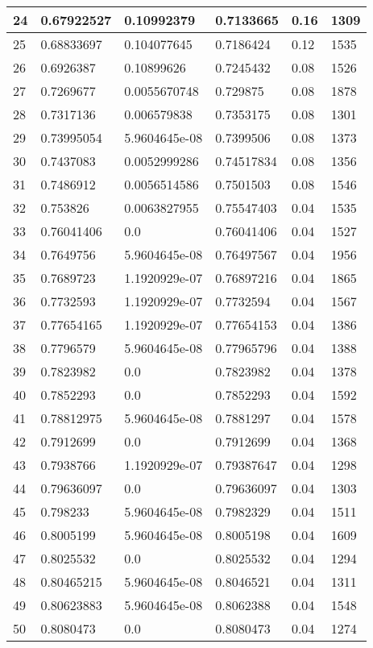 \begin{longtable}{|l|l|l|l|l|l|}
24 & 0.67922527 & 0.10992379 & 0.7133665 & 0.16 & 1309 \\ \hline 
25 & 0.68833697 & 0.104077645 & 0.7186424 & 0.12 & 1535 \\ \hline 
26 & 0.6926387 & 0.10899626 & 0.7245432 & 0.08 & 1526 \\ \hline 
27 & 0.7269677 & 0.0055670748 & 0.729875 & 0.08 & 1878 \\ \hline 
28 & 0.7317136 & 0.006579838 & 0.7353175 & 0.08 & 1301 \\ \hline 
29 & 0.73995054 & 5.9604645e-08 & 0.7399506 & 0.08 & 1373 \\ \hline 
30 & 0.7437083 & 0.0052999286 & 0.74517834 & 0.08 & 1356 \\ \hline 
31 & 0.7486912 & 0.0056514586 & 0.7501503 & 0.08 & 1546 \\ \hline 
32 & 0.753826 & 0.0063827955 & 0.75547403 & 0.04 & 1535 \\ \hline 
33 & 0.76041406 & 0.0 & 0.76041406 & 0.04 & 1527 \\ \hline 
34 & 0.7649756 & 5.9604645e-08 & 0.76497567 & 0.04 & 1956 \\ \hline 
35 & 0.7689723 & 1.1920929e-07 & 0.76897216 & 0.04 & 1865 \\ \hline 
36 & 0.7732593 & 1.1920929e-07 & 0.7732594 & 0.04 & 1567 \\ \hline 
37 & 0.77654165 & 1.1920929e-07 & 0.77654153 & 0.04 & 1386 \\ \hline 
38 & 0.7796579 & 5.9604645e-08 & 0.77965796 & 0.04 & 1388 \\ \hline 
39 & 0.7823982 & 0.0 & 0.7823982 & 0.04 & 1378 \\ \hline 
40 & 0.7852293 & 0.0 & 0.7852293 & 0.04 & 1592 \\ \hline 
41 & 0.78812975 & 5.9604645e-08 & 0.7881297 & 0.04 & 1578 \\ \hline 
42 & 0.7912699 & 0.0 & 0.7912699 & 0.04 & 1368 \\ \hline 
43 & 0.7938766 & 1.1920929e-07 & 0.79387647 & 0.04 & 1298 \\ \hline 
44 & 0.79636097 & 0.0 & 0.79636097 & 0.04 & 1303 \\ \hline 
45 & 0.798233 & 5.9604645e-08 & 0.7982329 & 0.04 & 1511 \\ \hline 
46 & 0.8005199 & 5.9604645e-08 & 0.8005198 & 0.04 & 1609 \\ \hline 
47 & 0.8025532 & 0.0 & 0.8025532 & 0.04 & 1294 \\ \hline 
48 & 0.80465215 & 5.9604645e-08 & 0.8046521 & 0.04 & 1311 \\ \hline 
49 & 0.80623883 & 5.9604645e-08 & 0.8062388 & 0.04 & 1548 \\ \hline 
50 & 0.8080473 & 0.0 & 0.8080473 & 0.04 & 1274 \\ \hline 
\end{longtable}